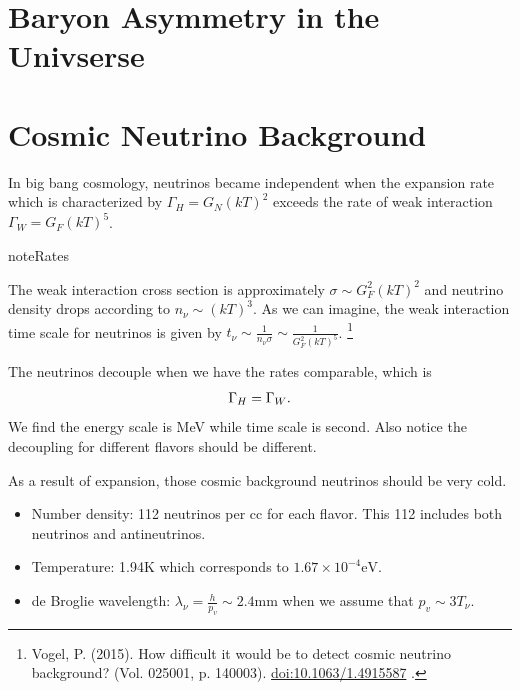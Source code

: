 \documentclass[letterpaper,12pt,english]{sphinxmanual}
\begin{document}
\section{Baryon Asymmetry in the Univserse}
\label{cosmology:baryon-asymmetry-in-the-univserse}

\section{Cosmic Neutrino Background}
\label{cosmology:cosmic-neutrino-background}\label{cosmology:index-1}
In big bang cosmology, neutrinos became independent when the expansion rate which is characterized by \(\Gamma_H=G_N (kT)^2\) exceeds the rate of weak interaction \(\Gamma_W=G_F (kT)^5\).

\begin{notice}{note}{Rates}

The weak interaction cross section is approximately \(\sigma\sim G_F^2 (kT)^2\) and neutrino density drops according to \(n_\nu \sim (kT)^3\). As we can imagine, the weak interaction time scale for neutrinos is given by \(t_\nu \sim \frac{1}{n_\nu \sigma} \sim \frac{1}{G_F^2(kT)^5}\). \footnote{
Vogel, P. (2015). How difficult it would be to detect cosmic neutrino background? (Vol. 025001, p. 140003). \href{http://dx.doi.org/10.1063/1.4915587}{doi:10.1063/1.4915587} .
}
\end{notice}

The neutrinos decouple when we have the rates comparable, which is
\begin{gather}
\begin{split}\Gamma_H = \Gamma_W.\end{split}\notag
\end{gather}
We find the energy scale is MeV while time scale is second. Also notice the decoupling for different flavors should be different.

As a result of expansion, those cosmic background neutrinos should be very cold.
\begin{itemize}
\item {} 
Number density: 112 neutrinos per cc for each flavor. This 112 includes both neutrinos and antineutrinos.

\item {} 
Temperature: 1.94K which corresponds to \(1.67\times 10^{-4}\mathrm{eV}\).

\item {} 
de Broglie wavelength: \(\lambda_\nu = \frac{h}{p_v}\sim 2.4 \mathrm{mm}\) when we assume that \(p_v\sim 3T_\nu\).

\end{itemize}
\end{document}
